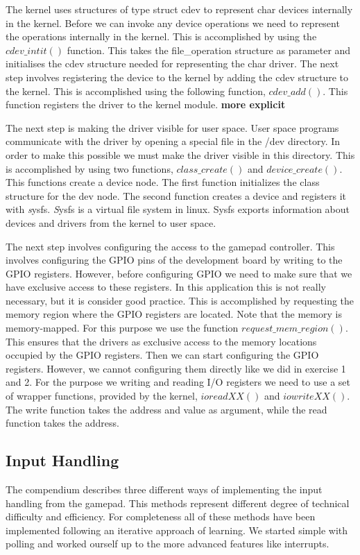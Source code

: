 The kernel uses structures of type struct cdev to represent char devices internally in the kernel. Before we can invoke any device operations we need to represent the operations internally in the kernel. This is accomplished by using the $cdev\_intit()$ function. This takes the file\_operation structure as parameter and initialises the cdev structure needed for representing the char driver. The next step involves registering the device to the kernel by adding the cdev structure to the kernel. This is accomplished using the following function, $cdev\_add()$. This function registers the driver to the kernel module. {\bf more explicit} 

The next step is making the driver visible for user space. User space programs communicate with the driver by opening a special file in the /dev directory. In order to make this possible we must make the driver visible in this directory. This is accomplished by using two functions, $class\_create()$ and $device\_create()$. This functions create a device node. The first function initializes the class structure for the dev node. The second function creates a device and registers it with \emph sysfs. \emph Sysfs is a virtual file system in linux. Sysfs exports information about devices and drivers from the kernel to user space. 


The next step involves configuring the access to the gamepad controller. This involves configuring the GPIO pins of the development board by writing to the GPIO registers. However, before configuring GPIO we need to make sure that we have exclusive access to these registers. In this application this is not really necessary, but it is consider good practice. This is accomplished by requesting the memory region where the GPIO registers are located. Note that the memory is memory-mapped. For this purpose we use the function $request\_mem\_region()$. This ensures that the drivers as exclusive access to the memory locations occupied by the GPIO registers. Then we can start configuring the GPIO registers. However, we cannot configuring them directly like we did in exercise 1 and 2. For the purpose we writing and reading I/O registers we need to use a set of wrapper functions, provided by the kernel, $ioreadXX()$ and $iowriteXX()$. The write function takes the address and value as argument, while the read function takes the address. 





\subsection{Input Handling}
The compendium describes three different ways of implementing the input handling from the gamepad. This methods represent different degree of technical difficulty and efficiency. For completeness all of these methods have been implemented following an iterative approach of learning. We started simple with polling and worked ourself up to the more advanced features like interrupts.

